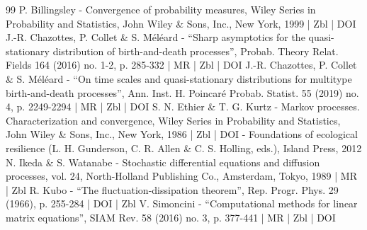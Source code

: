 \begin{thebibliography}{99}
P. Billingsley - Convergence of probability measures, Wiley Series in Probability and Statistics, John Wiley \& Sons, Inc., New York, 1999 | Zbl | DOI
J.-R. Chazottes, P. Collet \& S. Méléard - “Sharp asymptotics for the quasi-stationary distribution of birth-and-death processes”, Probab. Theory Relat. Fields 164 (2016) no. 1-2, p. 285-332 | MR | Zbl | DOI
J.-R. Chazottes, P. Collet \& S. Méléard - “On time scales and quasi-stationary distributions for multitype birth-and-death processes”, Ann. Inst. H. Poincaré Probab. Statist. 55 (2019) no. 4, p. 2249-2294 | MR | Zbl | DOI
S. N. Ethier \& T. G. Kurtz - Markov processes. Characterization and convergence, Wiley Series in Probability and Statistics, John Wiley \& Sons, Inc., New York, 1986 | Zbl | DOI
- Foundations of ecological resilience (L. H. Gunderson, C. R. Allen \& C. S. Holling, eds.), Island Press, 2012
N. Ikeda \& S. Watanabe - Stochastic differential equations and diffusion processes, vol. 24, North-Holland Publishing Co., Amsterdam, Tokyo, 1989 | MR | Zbl
R. Kubo - “The fluctuation-dissipation theorem”, Rep. Progr. Phys. 29 (1966), p. 255-284 | DOI | Zbl
V. Simoncini - “Computational methods for linear matrix equations”, SIAM Rev. 58 (2016) no. 3, p. 377-441 | MR | Zbl | DOI
\end{thebibliography}
